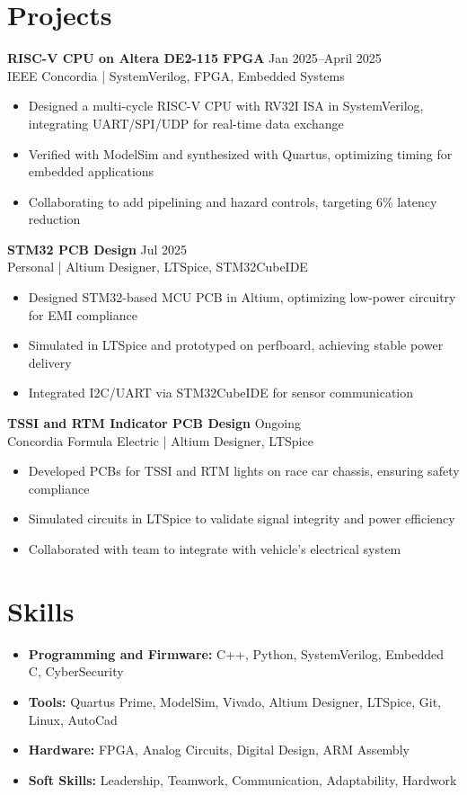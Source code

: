 \documentclass[10pt]{article}
\begin{document}
\section*{Projects}
\textbf{RISC-V CPU on Altera DE2-115 FPGA} \hfill Jan 2025--April 2025 \\
IEEE Concordia | SystemVerilog, FPGA, Embedded Systems
\begin{itemize}
    \item Designed a multi-cycle RISC-V CPU with RV32I ISA in SystemVerilog, integrating UART/SPI/UDP for real-time data exchange
    \item Verified with ModelSim and synthesized with Quartus, optimizing timing for embedded applications
    \item Collaborating to add pipelining and hazard controls, targeting 6\% latency reduction
\end{itemize}
\textbf{STM32 PCB Design} \hfill Jul 2025 \\
Personal | Altium Designer, LTSpice, STM32CubeIDE
\begin{itemize}
    \item Designed STM32-based MCU PCB in Altium, optimizing low-power circuitry for EMI compliance
    \item Simulated in LTSpice and prototyped on perfboard, achieving stable power delivery
    \item Integrated I2C/UART via STM32CubeIDE for sensor communication
\end{itemize}
\textbf{TSSI and RTM Indicator PCB Design} \hfill Ongoing \\
Concordia Formula Electric | Altium Designer, LTSpice
\begin{itemize}
    \item Developed PCBs for TSSI and RTM lights on race car chassis, ensuring safety compliance
    \item Simulated circuits in LTSpice to validate signal integrity and power efficiency
    \item Collaborated with team to integrate with vehicle’s electrical system
\end{itemize}

\section*{Skills}
\begin{itemize}
    \item \textbf{Programming and Firmware:} C++, Python, SystemVerilog, Embedded C, CyberSecurity
    \item \textbf{Tools:} Quartus Prime, ModelSim, Vivado, Altium Designer, LTSpice, Git, Linux, AutoCad
    \item \textbf{Hardware:} FPGA, Analog Circuits, Digital Design, ARM Assembly
    \item \textbf{Soft Skills:} Leadership, Teamwork, Communication, Adaptability, Hardwork
\end{itemize}
\end{document}

